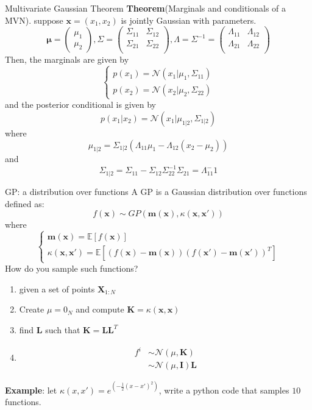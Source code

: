 \documentclass[10pt]{beamer}
\begin{document}
\begin{frame}[fragile]{Multivariate Gaussian Theorem} 
	\textbf{Theorem}(Marginals and conditionals of a MVN). suppose $\mathbf{x} = (x_1, x_2)$ is jointly Gaussian with parameters. 
	$$ \mathbf{\mu} = \left(\begin{array}{r}
		\mu_1\\ 
		\mu_2 
	\end{array}\right), \Sigma = \left(\begin{array}{rr}
		\Sigma_{11}& \Sigma_{12}\\ 
		\Sigma_{21}& \Sigma_{22}\\ 
	\end{array}\right), \Lambda = \Sigma^{-1} = \left(\begin{array}{rr}
		\Lambda_{11}& \Lambda_{12}\\ 
		\Lambda_{21}& \Lambda_{22}\\ 
	\end{array}\right)$$
	Then, the marginals are given by 
	$$ \begin{cases}
		p(x_1) = \mathcal{N}(x_1| \mu_1, \Sigma_{11}) \\ 
		p(x_2) = \mathcal{N}(x_2| \mu_2, \Sigma_{22})
	\end{cases}$$
	and the posterior conditional is given by
	$$ p(x_1| x_2) = \mathcal{N} (x_1| \mu_{1|2}, \Sigma_{1|2})$$
	where $$\mu_{1|2} = \Sigma_{1|2} (\Lambda_{11} \mu_1 - \Lambda_{12}(x_2 - \mu_2))$$ and $$\Sigma_{1|2} = \Sigma_{11} - \Sigma_{12}\Sigma_{22}^{-1} \Sigma_{21} = \Lambda_{11}^-1$$
\end{frame}

\begin{frame}{GP: a distribution over functions}
	A GP is a Gaussian distribution over functions defined as: 
	$$ f(\mathbf{x})  \sim GP (\mathbf{m}(\mathbf{x}), \kappa (\mathbf{x}, \mathbf{x}'))$$
	where 
	$$ \begin{cases}
		\mathbf{m}(\mathbf{x}) = \mathbb{E} [f(\mathbf{x})] \\ 
		\kappa (\mathbf{x}, \mathbf{x}') = \mathbb{E} \left[(f(\mathbf{x}) - \mathbf{m}(\mathbf{x}))(f(\mathbf{x}') - \mathbf{m}(\mathbf{x}'))^T\right]
	\end{cases}$$
	How do you sample such functions? 
	\begin{enumerate}
		\item given a set of points $\mathbf{X}_{1:N}$
		\item Create $\mu = 0_N$ and compute $\mathbf{K} =  \kappa (\mathbf{x}, \mathbf{x})$
		\item find $\mathbf{L}$ such that $\mathbf{K} = \mathbf{L}\mathbf{L}^T$
		\item \begin{align*}
			f^i &\sim \mathcal{N}(\mu, \mathbf{K})\\ 
			&\sim \mathcal{N}(\mu, \mathbf{I}) \mathbf{L}
		\end{align*}
	\end{enumerate}
	\textbf{Example}: let $\kappa (x, x') = e^{\left(-\frac{1}{2} (x-x')^2\right)}$, write a python code that samples $10$ functions.
\end{frame}
\end{document}
